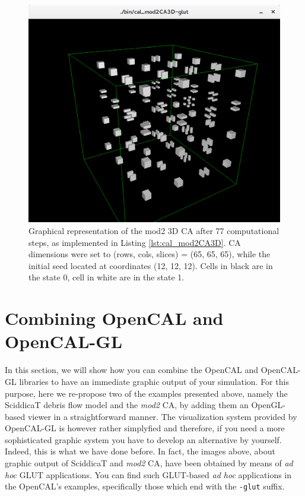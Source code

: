 \begin{figure}
  \begin{center}
    \includegraphics[width=12cm]{./images/OpenCAL/mod23DCA-glut}
    \caption{Graphical representation of the mod2 3D CA after 77 computational steps, as implemented in Listing \ref{lst:cal_mod2CA3D}. CA dimensions were set to (rows, cols, slices) = (65, 65, 65), while the initial seed located at coordinates (12, 12, 12). Cells in black are in the state 0, cell in white are in the state 1.}
    \label{fig:cal_mod2CA3D}
  \end{center}
\end{figure}


\section{Combining OpenCAL and OpenCAL-GL}

In this section, we will show how you can combine the OpenCAL and
OpenCAL-GL libraries to have an immediate graphic output of your
simulation. For this purpose, here we re-propose two of the examples
presented above, namely the SciddicaT debris flow model and the
\emph{mod2} CA, by adding them an OpenGL-based viewer in a
straightforward manner. The visualization system provided by
OpenCAL-GL is however rather simplyfied and therefore, if you need a
more sophisticated graphic system you have to develop an alternative
by yourself. Indeed, this is what we have done before. In fact, the
images above, about graphic output of SciddicaT and \emph{mod2} CA,
have been obtained by means of \emph{ad hoc} GLUT applications. You
can find such GLUT-based \emph{ad hoc} applications in the OpenCAL's
examples, specifically those which end with the \verb'-glut' suffix.

